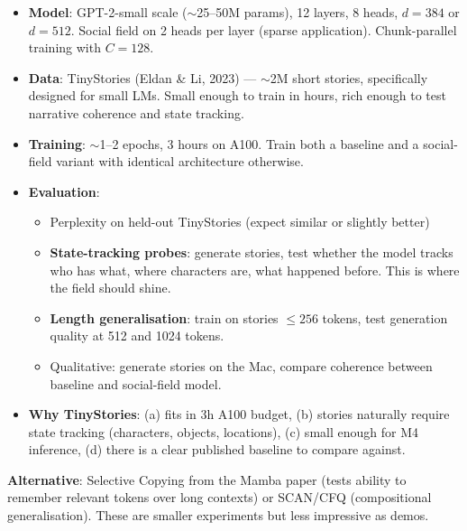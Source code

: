 \documentclass[11pt,a4paper]{article}
\begin{document}
\begin{itemize}
    \item \textbf{Model}: GPT-2-small scale ($\sim$25--50M params),
          12 layers, 8 heads, $d=384$ or $d=512$.
          Social field on 2 heads per layer (sparse application).
          Chunk-parallel training with $C=128$.

    \item \textbf{Data}: TinyStories (Eldan \& Li, 2023) ---
          $\sim$2M short stories, specifically designed for
          small LMs.  Small enough to train in hours, rich enough
          to test narrative coherence and state tracking.

    \item \textbf{Training}: $\sim$1--2 epochs, 3 hours on A100.
          Train both a baseline and a social-field variant with
          identical architecture otherwise.

    \item \textbf{Evaluation}:
          \begin{itemize}
              \item Perplexity on held-out TinyStories (expect
                    similar or slightly better)
              \item \textbf{State-tracking probes}: generate
                    stories, test whether the model tracks who
                    has what, where characters are, what happened
                    before.  This is where the field should shine.
              \item \textbf{Length generalisation}: train on
                    stories $\leq 256$ tokens, test generation
                    quality at 512 and 1024 tokens.
              \item Qualitative: generate stories on the Mac,
                    compare coherence between baseline and
                    social-field model.
          \end{itemize}

    \item \textbf{Why TinyStories}: (a) fits in 3h A100 budget,
          (b) stories naturally require state tracking (characters,
          objects, locations), (c) small enough for M4 inference,
          (d) there is a clear published baseline to compare against.
\end{itemize}

\textbf{Alternative}: Selective Copying from the Mamba paper (tests
ability to remember relevant tokens over long contexts) or SCAN/CFQ
(compositional generalisation).  These are smaller experiments but
less impressive as demos.
\end{document}

